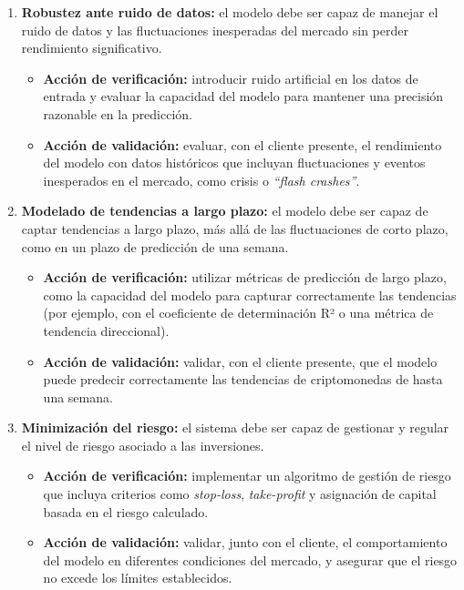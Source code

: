 \documentclass[
    11pt, %
]{charter}
\begin{document}
\begin{enumerate}
    \item \textbf{Robustez ante ruido de datos:} el modelo debe ser capaz de manejar el ruido de datos y las fluctuaciones inesperadas del mercado sin perder rendimiento significativo.
      \begin{itemize}
      \item \textbf{Acción de verificación:} introducir ruido artificial en los datos de entrada y evaluar la capacidad del modelo para mantener una precisión razonable en la predicción.
      \item \textbf{Acción de validación:} evaluar, con el cliente presente, el rendimiento del modelo con datos históricos que incluyan fluctuaciones y eventos inesperados en el mercado, como crisis o \textit{“flash crashes”}.
      \end{itemize}

    \item \textbf{Modelado de tendencias a largo plazo:} el modelo debe ser capaz de captar tendencias a largo plazo, más allá de las fluctuaciones de corto plazo, como en un plazo de predicción de una semana.
      \begin{itemize}
      \item \textbf{Acción de verificación:} utilizar métricas de predicción de largo plazo, como la capacidad del modelo para capturar correctamente las tendencias (por ejemplo, con el coeficiente de determinación R² o una métrica de tendencia direccional).
      \item \textbf{Acción de validación:} validar, con el cliente presente, que el modelo puede predecir correctamente las tendencias de criptomonedas de hasta una semana.
      \end{itemize}

    \item \textbf{Minimización del riesgo:} el sistema debe ser capaz de gestionar y regular el nivel de riesgo asociado a las inversiones.
      \begin{itemize}
      \item \textbf{Acción de verificación:} implementar un algoritmo de gestión de riesgo que incluya criterios como \textit{stop-loss}, \textit{take-profit} y asignación de capital basada en el riesgo calculado.
      \item \textbf{Acción de validación:} validar, junto con el cliente, el comportamiento del modelo en diferentes condiciones del mercado, y asegurar que el riesgo no excede los límites establecidos.
      \end{itemize}


\end{enumerate}
\end{document}
